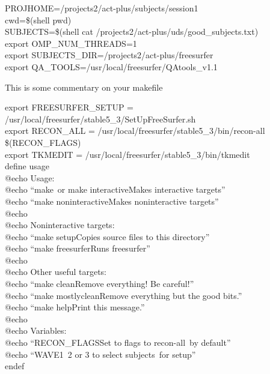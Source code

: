 \begin{makefileread}
	
	

PROJHOME=/projects2/act-plus/subjects/session1 \\

cwd=\$(shell pwd) \\

SUBJECTS=\$(shell cat /projects2/act-plus/uds/good_subjects.txt) \\

export OMP_NUM_THREADS=1 \\

export SUBJECTS_DIR=/projects2/act-plus/freesurfer \\
export QA_TOOLS=/usr/local/freesurfer/QAtools_v1.1 \\

\begin{center}
	\begin{minipage}{0.65\textwidth}
		This is some commentary on your makefile
		\lmhrule
	\end{minipage}
\end{center}

export FREESURFER_SETUP = /usr/local/freesurfer/stable5_3/SetUpFreeSurfer.sh \\
export RECON_ALL = /usr/local/freesurfer/stable5_3/bin/recon-all \$(RECON_FLAGS) \\
export TKMEDIT = /usr/local/freesurfer/stable5_3/bin/tkmedit \\

define usage \\
@echo Usage: \\
@echo ``make\, or make interactive\hfill Makes interactive targets'' \\ 
@echo ``make noninteractive\hfill Makes noninteractive targets'' \\ 
@echo \\
@echo Noninteractive targets: \\
@echo ``make setup\hfill Copies source files to this directory'' \\ 
@echo ``make freesurfer\hfill Runs freesurfer'' \\ 
@echo \\
@echo Other useful targets: \\
@echo ``make clean\hfill Remove everything! Be careful!'' \\ 
@echo ``make mostlyclean\hfill Remove everything but the good bits.'' \\ 
@echo ``make help\hfill Print this message.'' \\ 
@echo \\
@echo Variables: \\
@echo ``RECON_FLAGS\hfill Set to flags to recon-all\, by default'' \\ 
@echo ``WAVE\hfill 1\, 2 or 3 to select subjects\, for setup'' \\ 
endef \\


\end{makefileread}
